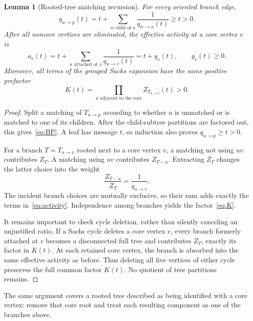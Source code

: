 \documentclass[11pt]{article}
\newtheorem{lemma}[theorem]{Lemma}
\theoremstyle{remark}
\begin{document}
\begin{lemma}[Rooted-tree matching recursion]\label{lem:BP}
For every oriented branch edge,
\begin{equation}\label{eq:BP}
 q_{u\to p}(t)=t+\sum_{w\text{ child of }u}\frac1{q_{w\to u}(t)}
 \geq t>0.
\end{equation}
After all noncore vertices are eliminated, the effective activity at a core
vertex $v$ is
\begin{equation}\label{eq:activity}
 a_v(t)=t+\sum_{u\text{ attached at }v}\frac1{q_{u\to v}(t)}
       =t+y_v(t),
 \qquad y_v(t)\geq0.
\end{equation}
Moreover, all terms of the grouped Sachs expansion have the same positive
prefactor
\begin{equation}\label{eq:K}
 K(t)=\prod_{u\text{ adjacent to the core}}Z_{T_{u\to v}}(t)>0.
\end{equation}
\end{lemma}

\begin{proof}
Split a matching of $T_{u\to p}$ according to whether $u$ is unmatched or is
matched to one of its children.  After the child-subtree partitions are
factored out, this gives~\eqref{eq:BP}.  A leaf has message $t$, so induction
also proves $q_{u\to p}\geq t>0$.

For a branch $T=T_{u\to v}$ rooted next to a core vertex $v$, a matching not
using $uv$ contributes $Z_T$.  A matching using $uv$ contributes $Z_{T-u}$.
Extracting $Z_T$ changes the latter choice into the weight
\[
 \frac{Z_{T-u}}{Z_T}=\frac1{q_{u\to v}}.
\]
The incident branch choices are mutually exclusive, so their sum adds exactly
the terms in~\eqref{eq:activity}.  Independence among branches yields the
factor~\eqref{eq:K}.

It remains important to check cycle deletion, rather than silently canceling
an unjustified ratio.  If a Sachs cycle deletes a core vertex $v$, every
branch formerly attached at $v$ becomes a disconnected full tree and
contributes $Z_T$, exactly its factor in $K(t)$.  At each retained core
vertex, the branch is absorbed into the same effective activity as before.
Thus deleting all five vertices of either cycle preserves the full common
factor $K(t)$.  No quotient of tree partitions remains.
\end{proof}

The same argument covers a rooted tree described as being identified with a
core vertex: remove that core root and treat each resulting component as one
of the branches above.
\end{document}
